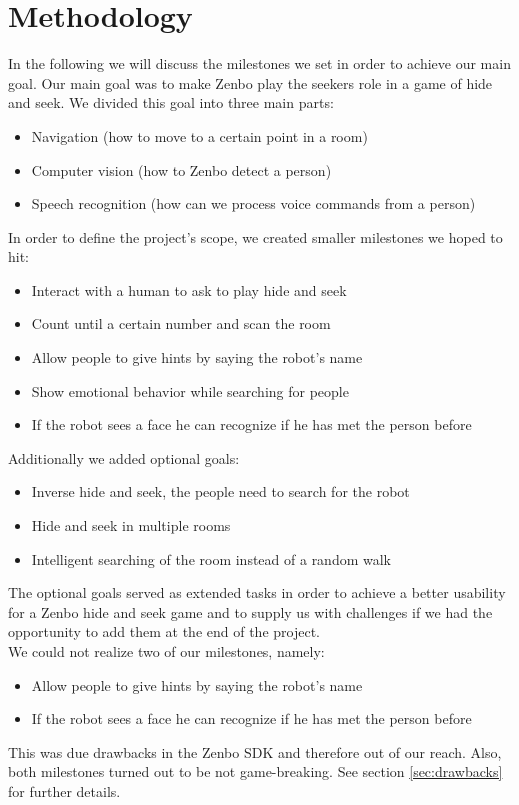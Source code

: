 \documentclass[conference]{IEEEtran}
\begin{document}
\section{Methodology}
In the following we will discuss the milestones we set in order to achieve our main goal.
Our main goal was to make Zenbo play the seekers role in a game of hide and seek.
We divided this goal into three main parts:
\begin{itemize}
	\item Navigation (how to move to a certain point in a room)
	\item Computer vision (how to Zenbo detect a person)
	\item Speech recognition (how can we process voice commands from a person)
\end{itemize}
In order to define the project's scope, we created smaller milestones we hoped to hit:
\begin{itemize}
	\item Interact with a human to ask to play hide and seek
	\item Count until a certain number and scan the room
	\item Allow people to give hints by saying the robot's name
	\item Show emotional behavior while searching for people
	\item If the robot sees a face he can recognize if he has met the person before
\end{itemize}
Additionally we added optional goals:
\begin{itemize}
	\item Inverse hide and seek, the people need to search for the robot
	\item Hide and seek in multiple rooms
	\item Intelligent searching of the room instead of a random walk
\end{itemize}
The optional goals served as extended tasks in order to achieve a better usability for a Zenbo hide and seek game and to
supply us with challenges if we had the opportunity to add them at the end of the project.\\
We could not realize two of our milestones, namely:
\begin{itemize}
	\item Allow people to give hints by saying the robot's name
	\item If the robot sees a face he can recognize if he has met the person before
\end{itemize}
This was due drawbacks in the Zenbo SDK and therefore out of our reach.
Also, both milestones turned out to be not game-breaking. See section \ref{sec:drawbacks} for further details.
\\\\
\end{document}
